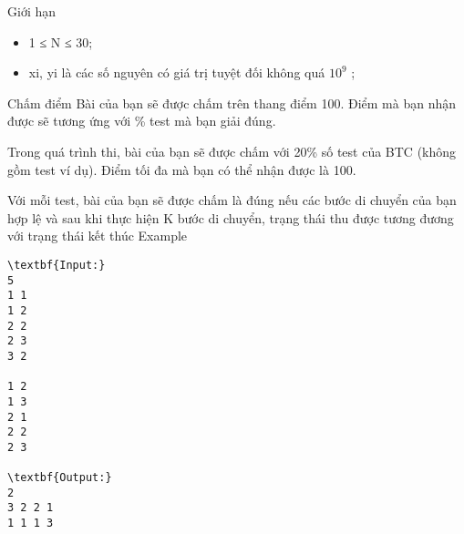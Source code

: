 Giới hạn  
\begin{itemize}
	\item     1 ≤ N ≤ 30;   
	\item     xi, yi là các số nguyên có giá trị tuyệt đối không quá $10^{9}$    ;   
\end{itemize}
   Chấm điểm  
Bài của bạn sẽ được chấm trên thang điểm 100. Điểm mà bạn nhận được sẽ tương ứng với \% test mà bạn giải đúng.  

   Trong quá trình thi, bài của bạn sẽ được chấm với 20\% số test của BTC (không gồm test ví dụ). Điểm tối đa mà bạn có thể nhận được là 100.  

   Với mỗi test, bài của bạn sẽ được chấm là đúng nếu các bước di chuyển của bạn hợp lệ và sau khi thực hiện K bước di chuyển, trạng thái thu được tương đương với trạng thái kết thúc
   Example  
\begin{verbatim}
\textbf{Input:}
5
1 1
1 2
2 2
2 3
3 2

1 2
1 3
2 1
2 2
2 3

\textbf{Output:}
2
3 2 2 1
1 1 1 3
\end{verbatim}